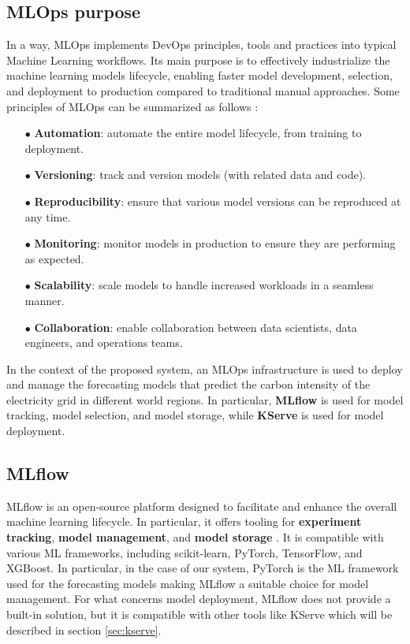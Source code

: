 \subsection{MLOps purpose}

In a way, MLOps implements DevOps principles, tools and practices into typical Machine Learning workflows.
Its main purpose is to effectively industrialize the machine learning models lifecycle, enabling faster model development, selection, and deployment to production compared to traditional manual approaches.
Some principles of MLOps can be summarized as follows \cite{mlops_ubuntu}:
\begin{itemize}[itemsep=0.2pt, topsep=1pt]
  \item[$\bullet$] \textbf{Automation}: automate the entire model lifecycle, from training to deployment.
  \item[$\bullet$] \textbf{Versioning}: track and version models (with related data and code).
  \item[$\bullet$] \textbf{Reproducibility}: ensure that various model versions can be reproduced at any time.
  \item[$\bullet$] \textbf{Monitoring}: monitor models in production to ensure they are performing as expected.
  \item[$\bullet$] \textbf{Scalability}: scale models to handle increased workloads in a seamless manner.
  \item[$\bullet$] \textbf{Collaboration}: enable collaboration between data scientists, data engineers, and operations teams.
\end{itemize}

In the context of the proposed system, an MLOps infrastructure is used to deploy and manage the forecasting models that predict the carbon intensity of the electricity grid in different world regions.
In particular, \textbf{MLflow} is used for model tracking, model selection, and model storage, while \textbf{KServe} is used for model deployment.

\subsection{MLflow}

MLflow is an open-source platform designed to facilitate and enhance the overall machine learning lifecycle. 
In particular, it offers tooling for \textbf{experiment tracking}, \textbf{model management}, and \textbf{model storage} \cite{mlflow_docs}.
It is compatible with various ML frameworks, including scikit-learn, PyTorch, TensorFlow, and XGBoost.
In particular, in the case of our system, PyTorch is the ML framework used for the forecasting models making MLflow a suitable choice for model management.
For what concerns model deployment, MLflow does not provide a built-in solution, but it is compatible with other tools like KServe which will be described in section \ref{sec:kserve}.

